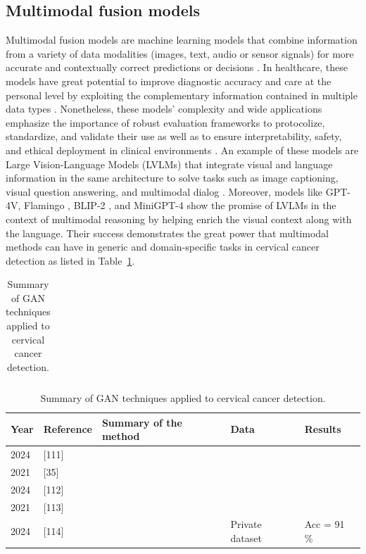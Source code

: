 \documentclass[final,5p,times,twocolumn,authoryear]{elsarticle}
\begin{document}
\subsection{Multimodal fusion models}
Multimodal fusion models are machine learning models that combine information from a variety of data modalities (images, text, audio or sensor signals) for more accurate and contextually correct predictions or decisions \cite{ref115,ref116}. In healthcare, these models have great potential to improve diagnostic accuracy and care at the personal level by exploiting the complementary information contained in multiple data types \cite{ref117}. Nonetheless, these models’ complexity and wide applications emphasize the importance of robust evaluation frameworks to protocolize, standardize, and validate their use as well as to ensure interpretability, safety, and ethical deployment in clinical environments \cite{ref118}.
An example of these models are Large Vision-Language Models (LVLMs) that integrate visual and language information in the same architecture to solve tasks such as image captioning, visual question answering, and multimodal dialog \cite{ref118}. Moreover, models like GPT-4V, Flamingo \cite{ref119}, BLIP-2 \cite{ref120}, and MiniGPT-4 \cite{ref121} show the promise of LVLMs in the context of multimodal reasoning by helping enrich the visual context along with the language. Their success demonstrates the great power that multimodal methods can have in generic and domain-specific tasks in cervical cancer detection as listed in Table~\ref{tab:gan_summary}.
\begin{table}
\centering
\caption{Summary of GAN techniques applied to cervical cancer detection.}
\label{tab:gan_summary}
\begin{tabular}{lll}
\hline
\end{tabular}
\end{table}

\begin{table}
\centering
\caption{Summary of GAN techniques applied to cervical cancer detection.}
\label{tab:gan_cervical_cancer}
\begin{tabular}{lllll}
\hline
Year & Reference & Summary of the method & Data & Results \\
\hline
2024 & [111] & & & \\
2021 & [35] & & & \\
2024 & [112] & & & \\
2021 & [113] & & & \\
2024 & [114] & & Private dataset & Acc = 91 \% \\
\hline
\end{tabular}
\end{table}
\end{document}
